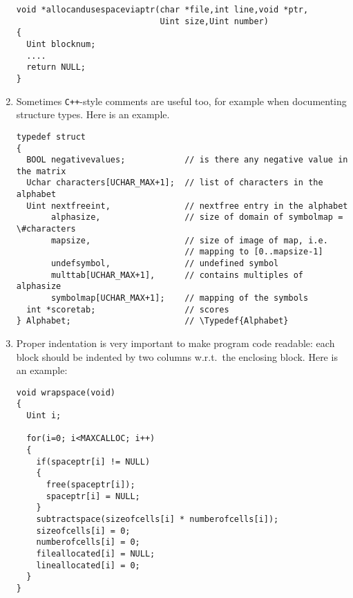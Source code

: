 \documentclass[12pt]{article}
\begin{document}
\begin{enumerate}
\begin{footnotesize}
\begin{verbatim}
void *allocandusespaceviaptr(char *file,int line,void *ptr,
                             Uint size,Uint number)
{
  Uint blocknum;
  ....
  return NULL;
}
\end{verbatim}
\end{footnotesize}
\item
Sometimes \texttt{C++}-style comments are useful too, for example
when documenting structure types. Here is an example.
\begin{footnotesize}
\begin{verbatim}
typedef struct
{
  BOOL negativevalues;            // is there any negative value in the matrix
  Uchar characters[UCHAR_MAX+1];  // list of characters in the alphabet
  Uint nextfreeint,               // nextfree entry in the alphabet
       alphasize,                 // size of domain of symbolmap = \#characters
       mapsize,                   // size of image of map, i.e. 
                                  // mapping to [0..mapsize-1]
       undefsymbol,               // undefined symbol
       multtab[UCHAR_MAX+1],      // contains multiples of alphasize
       symbolmap[UCHAR_MAX+1];    // mapping of the symbols
  int *scoretab;                  // scores
} Alphabet;                       // \Typedef{Alphabet}
\end{verbatim}
\end{footnotesize}
\item
Proper indentation is very important to make program code readable: each block
should be indented by two columns w.r.t.\ the enclosing block.
Here is an example:
\begin{footnotesize} 
\begin{verbatim}
void wrapspace(void)
{ 
  Uint i; 

  for(i=0; i<MAXCALLOC; i++)
  { 
    if(spaceptr[i] != NULL)
    {
      free(spaceptr[i]);
      spaceptr[i] = NULL;
    }
    subtractspace(sizeofcells[i] * numberofcells[i]);
    sizeofcells[i] = 0;
    numberofcells[i] = 0;
    fileallocated[i] = NULL;
    lineallocated[i] = 0;
  }
}
\end{verbatim}
\end{footnotesize}



\end{enumerate}
\end{document}

